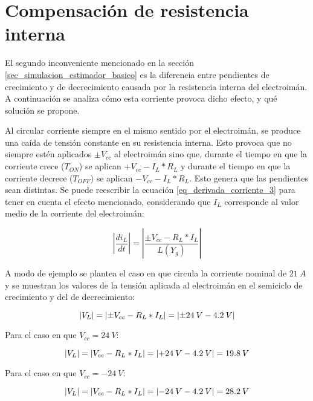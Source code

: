 \section{Compensación de resistencia interna}

El segundo inconveniente mencionado en la sección \ref{sec_simulacion_estimador_basico} es la diferencia entre pendientes de crecimiento y de decrecimiento causada por la resistencia interna del electroimán. A continuación se analiza cómo esta corriente provoca dicho efecto, y qué solución se propone.

Al circular corriente siempre en el mismo sentido por el electroimán, se produce una caída de tensión constante en su resistencia interna. Esto provoca que no siempre estén aplicados $\pm V_{cc}$ al electroimán sino que, durante el tiempo en que la corriente crece ($T_{ON}$) se aplican $+V_{cc}-I_L*R_L$ y durante el tiempo en que la corriente decrece ($T_{OFF}$) se aplican $-V_{cc}-I_L*R_L$. Esto genera que las pendientes sean distintas. Se puede reescribir la ecuación \ref{eq_derivada_corriente_3} para tener en cuenta el efecto mencionado, considerando que $I_L$ corresponde al valor medio de la corriente del electroimán:

\begin{equation} \label{eq_Vbus-didt-RL}
	\left|\frac{di_L}{dt}\right|=\left|\frac{\pm V_{cc}-R_L*I_L}{L(Y_g)}\right|
\end{equation}

A modo de ejemplo se plantea el caso en que circula la corriente nominal de $21\:A$ y se muestran los valores de la tensión aplicada al electroimán en el semiciclo de crecimiento y del de decrecimiento:

\begin{equation} \label{eq_Vbus-didt-RL-2}
	\lvert V_L\rvert=\lvert\pm V_{cc}-R_L*I_L\rvert= \lvert\pm 24\:V-4.2\:V\rvert
\end{equation}

Para el caso en que $V_{cc}=24\:V$:

\begin{equation} \label{eq_Vbus-didt-RL-3}
	\lvert V_L\rvert=\lvert V_{cc}-R_L*I_L\rvert=\lvert+24\:V-4.2\:V\rvert= 19.8\:V
\end{equation}

Para el caso en que $V_{cc}=-24\:V$:

\begin{equation} \label{eq_Vbus-didt-RL-4}
	\lvert V_L\rvert=\lvert V_{cc}-R_L*I_L\rvert= \lvert-24\:V-4.2\:V\rvert= 28.2\:V
\end{equation}

